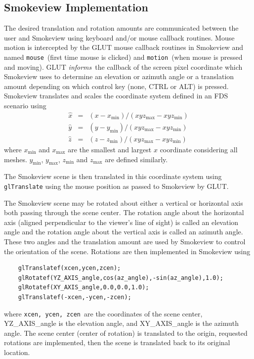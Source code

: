 \documentclass[11pt,twoside]{book}
\begin{document}
\subsection{Smokeview Implementation}
The desired translation and rotation amounts are communicated
between the user and Smokeview using keyboard and/or mouse
callback routines.  Mouse motion is intercepted by the GLUT mouse
callback routines in Smokeview and named {\tt mouse}\ (first time
mouse is clicked) and {\tt motion}\ (when mouse is pressed and
moving).  GLUT {\em informs}\ the callback of the screen pixel
coordinate which Smokeview uses to determine an elevation or
azimuth angle or a translation amount depending on which control
key (none, CTRL or ALT) is pressed. Smokeview translates and
scales the coordinate system defined in an FDS scenario using
\newcommand{\mmin}{\mbox{min}}
\newcommand{\mmax}{\mbox{max}}
\begin{eqnarray*}
\hat{x}&=&(x-x_{\min})/(xyz_{\max}-xyz_{\min})\\
\hat{y}&=&(y-y_{\min})/(xyz_{\max}-xyz_{\min})\\
\hat{z}&=&(z-z_{\min})/(xyz_{\max}-xyz_{\min})
\end{eqnarray*}
where $x_{\min}$ and $x_{\max}$ are the smallest and largest $x$
coordinate considering all meshes.  $y_{\min}$, $y_{\max}$,
$z_{\min}$ and $z_{\max}$ are defined similarly.

The Smokeview scene is then translated in this coordinate system
using {\tt glTranslate} using the mouse position as passed to
Smokeview by GLUT.

The Smokeview scene may be rotated about either a vertical or
horizontal axis both passing through the scene center.  The
rotation angle about the horizontal axis (aligned perpendicular to
the viewer's line of sight) is called an elevation angle and the
rotation angle about the vertical axis is called an azimuth angle.
These two angles and the translation amount are used by Smokeview
to control the orientation of the scene.   Rotations are then
implemented in Smokeview using
\begin{verbatim}
    glTranslatef(xcen,ycen,zcen);
    glRotatef(YZ_AXIS_angle,cos(az_angle),-sin(az_angle),1.0);
    glRotatef(XY_AXIS_angle,0.0,0.0,1.0);
    glTranslatef(-xcen,-ycen,-zcen);
\end{verbatim}
where {\tt xcen, ycen, zcen}\ are the coordinates of the scene center, YZ\_AXIS\_angle is the elevation angle, and XY\_AXIS\_angle is the azimuth angle.  The scene center (center of rotation) is translated to the origin, requested rotations are implemented, then the scene is translated back to its original location.
\end{document}
